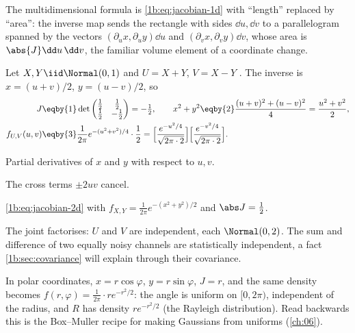 The multidimensional formula is \eqref{1b:eq:jacobian-1d} with ``length''
replaced by ``area'': the inverse map sends the rectangle with sides
$\dd u,\dd v$ to a parallelogram spanned by the vectors
$(\partial_ux,\partial_uy)\dd u$ and $(\partial_vx,\partial_vy)\dd v$, whose
area is $\abs{J}\dd u\,\dd v$, the familiar volume element of a coordinate
change.

\label{1b:ex:sum-diff}
Let $X,Y\iid\Normal(0,1)$ and $U=X+Y$, $V=X-Y$
. The inverse is $x=(u+v)/2$,
$y=(u-v)/2$, so
\begin{align*}
  J&\eqby{1}\det\begin{pmatrix}\tfrac12&\tfrac12\\ \tfrac12&-\tfrac12\end{pmatrix}=-\tfrac12,
  \qquad x^2+y^2\eqby{2}\frac{(u+v)^2+(u-v)^2}{4}=\frac{u^2+v^2}{2},\\
  f_{U,V}(u,v)
  &\eqby{3} \frac{1}{2\pi}e^{-(u^2+v^2)/4}\cdot\frac12
   = \Bigl[\frac{e^{-u^2/4}}{\sqrt{2\pi\cdot2}}\Bigr]
     \Bigl[\frac{e^{-v^2/4}}{\sqrt{2\pi\cdot2}}\Bigr].
\end{align*}
\begin{explain}
  \item Partial derivatives of $x$ and $y$ with respect to $u,v$.
  \item The cross terms $\pm2uv$ cancel.
  \item \eqref{1b:eq:jacobian-2d} with
        $f_{X,Y}=\tfrac{1}{2\pi}e^{-(x^2+y^2)/2}$ and $\abs J=\tfrac12$.
\end{explain}
The joint factorises: $U$ and $V$ are independent, each $\Normal(0,2)$. The
sum and difference of two equally noisy channels are statistically
independent, a fact \cref{1b:sec:covariance} will explain through their
covariance.

In polar coordinates, $x=r\cos\varphi$, $y=r\sin\varphi$, $J=r$, and the
same density becomes $f(r,\varphi)=\frac{1}{2\pi}\cdot re^{-r^2/2}$: the angle
is uniform on $[0,2\pi)$, independent of the radius, and $R$ has density
$re^{-r^2/2}$ (the Rayleigh distribution). Read backwards this is the
Box--Muller recipe for making Gaussians from uniforms (\cref{ch:06}).

